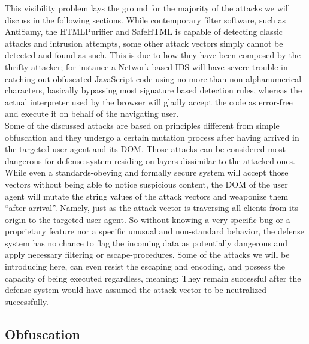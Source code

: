     This visibility problem lays the ground for the majority of the attacks we will discuss in the following sections. While contemporary filter software, such as AntiSamy, the HTMLPurifier and SafeHTML is capable of detecting classic attacks and intrusion attempts, some other attack vectors simply cannot be detected and found as such. This is due to how they have been composed by the thrifty attacker; for instance a Network-based IDS will have severe trouble in catching out obfuscated JavaScript code using no more than non-alphanumerical characters, basically bypassing most signature based detection rules, whereas the actual interpreter used by the browser will gladly accept the code as error-free and execute it on behalf of the navigating user.\\

    Some of the discussed attacks are based on principles different from simple obfuscation and they undergo a certain mutation process after having arrived in the targeted user agent and its DOM. Those attacks can be considered most dangerous for defense system residing on layers dissimilar to the attacked ones. While even a standards-obeying and formally secure system will accept those vectors without being able to notice suspicious content, the DOM of the user agent will mutate the string values of the attack vectors and weaponize them ``after arrival''. Namely, just as the attack vector is traversing all clients from its origin to the targeted user agent. So without knowing a very specific bug or a proprietary feature nor a specific unusual and non-standard behavior, the defense system has no chance to flag the incoming data as potentially dangerous and apply necessary filtering or escape-procedures. Some of the attacks we will be introducing here, can even resist the escaping and encoding, and possess 
the capacity of being executed regardless, meaning: They remain successful after the defense system would have assumed the attack vector to be neutralized successfully.

    \subsection{Obfuscation}
    \label{subsubsec:5.4.2.obfuscation}

